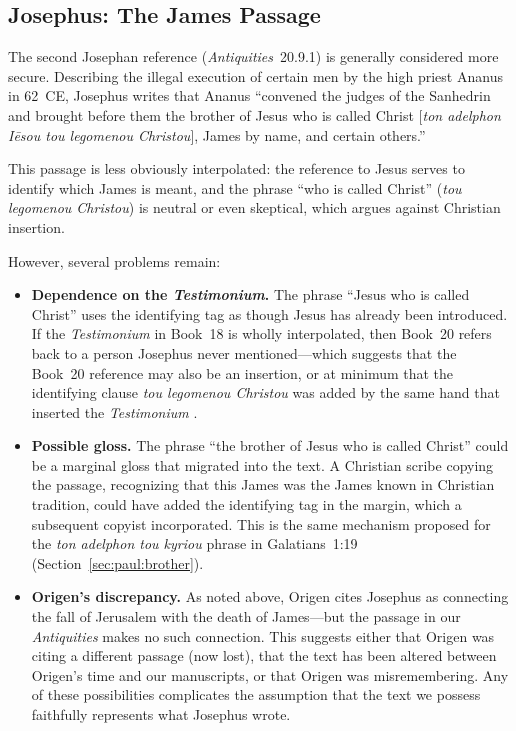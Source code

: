 \documentclass[12pt,oneside]{article}
\newcommand{\grk}[1]{\textit{#1}}   %
\begin{document}
\subsection{Josephus: The James Passage}
\label{sec:external:james}

The second Josephan reference (\textit{Antiquities}~20.9.1) is
generally considered more secure.  Describing the illegal execution of
certain men by the high priest Ananus in 62~CE, Josephus writes that
Ananus ``convened the judges of the Sanhedrin and brought before them
the brother of Jesus who is called Christ [\grk{ton adelphon I\=esou
tou legomenou Christou}], James by name, and certain others.''

This passage is less obviously interpolated: the reference to Jesus
serves to identify which James is meant, and the phrase ``who is called
Christ'' (\grk{tou legomenou Christou}) is neutral or even skeptical,
which argues against Christian insertion.

However, several problems remain:

\begin{itemize}[leftmargin=2em]
\item \textbf{Dependence on the \textit{Testimonium}.}  The phrase
``Jesus who is called Christ'' uses the identifying tag as though
Jesus has already been introduced.  If the \textit{Testimonium} in
Book~18 is wholly interpolated, then Book~20 refers back to a person
Josephus never mentioned---which suggests that the Book~20 reference
may also be an insertion, or at minimum that the identifying clause
\grk{tou legomenou Christou} was added by the same hand that
inserted the \textit{Testimonium} \citep{Carrier2014}.

\item \textbf{Possible gloss.}  The phrase ``the brother of Jesus who
is called Christ'' could be a marginal gloss that migrated into the
text.  A Christian scribe copying the passage, recognizing that this
James was the James known in Christian tradition, could have added
the identifying tag in the margin, which a subsequent copyist
incorporated.  This is the same mechanism proposed for the
\grk{ton adelphon tou kyriou} phrase in Galatians~1:19
(Section~\ref{sec:paul:brother}).

\item \textbf{Origen's discrepancy.}  As noted above, Origen cites
Josephus as connecting the fall of Jerusalem with the death of
James---but the passage in our \textit{Antiquities} makes no such
connection.  This suggests either that Origen was citing a different
passage (now lost), that the text has been altered between Origen's
time and our manuscripts, or that Origen was misremembering.  Any of
these possibilities complicates the assumption that the text we
possess faithfully represents what Josephus wrote.
\end{itemize}
\end{document}
